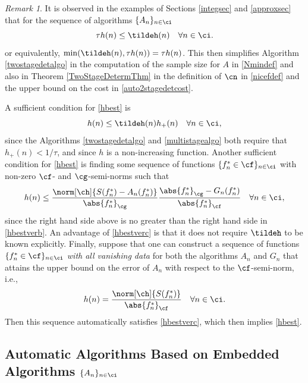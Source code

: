 \documentclass[]{elsarticle}
\theoremstyle{definition}
\theoremstyle{remark}
\newtheorem{rem}{Remark}
\newcommand{\Fnorm}[1]{\abs{#1}_{\cf}}
\newcommand{\Gnorm}[1]{\abs{#1}_{\cg}}
\begin{document}
\begin{rem} It is observed in the examples of Sections \ref{integsec} and \ref{approxsec} that for the sequence of algorithms $\{A_n\}_{n \in \ci}$
\begin{equation} \label{hbest}
\tau h(n) \le \tildeh(n) \quad \forall n \in \ci.
\end{equation}
or equivalently, $\min(\tildeh(n),\tau h(n))=\tau h(n)$.  This then simplifies Algorithm \ref{twostagedetalgo} in the computation of the sample size for $A$ in \eqref{Nmindef} and also in Theorem \ref{TwoStageDetermThm} in the definition of $\cn$ in \eqref{nicefdef} and the upper bound on the cost in \eqref{auto2stagedetcost}. 

A sufficient condition for \eqref{hbest} is
\begin{equation} \label{hbestverb}
h(n) \le \tildeh(n) h_{+}(n) \quad \forall n \in \ci,
\end{equation}
since the Algorithms \ref{twostagedetalgo} and \ref{multistagealgo} both require that $h_{+}(n) < 1/\tau$, and since $h$ is a non-increasing function.   Another 
sufficient condition for \eqref{hbest} is finding some sequence of functions $\{f^*_n \in \cf\}_{n \in \ci}$ with non-zero $\cf$- and $\cg$-semi-norms such that 
\begin{equation} \label{hbestverc}
h(n) \le \frac{\norm[\ch]{S(f^*_n)-A_n(f_n^*)}}{\Gnorm{f_n^*}} \frac{\Gnorm{f^*_n}-G_n(f^*_n)}{\Fnorm{f^*_n}}   \quad \forall n \in \ci,
\end{equation}
since the right hand side above is no greater than the right hand side in \eqref{hbestverb}. An advantage of \eqref{hbestverc} is that it does not require $\tildeh$ to be known explicitly. Finally, suppose that one can construct a sequence of functions $\{f^*_n \in \cf\}_{n \in \ci}$ \emph{with all vanishing data} for both the algorithms $A_n$ and $G_n$ that attains the upper bound on the error of $A_n$ with respect to the $\cf$-semi-norm, i.e.,
\begin{equation} \label{hbestverd}
h(n) = \frac{\norm[\ch]{S(f^*_n)}}{\Fnorm{f^*_n}}   \quad \forall n \in \ci.
\end{equation}
Then this sequence automatically satisfies \eqref{hbestverc}, which then implies \eqref{hbest}.
\end{rem}


\subsection{Automatic Algorithms Based on Embedded Algorithms $\{A_n\}_{n \in \ci}$}
\end{document}
